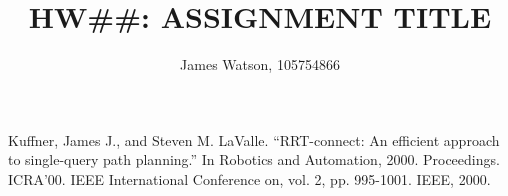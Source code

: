 \documentclass{hw_grad}
\title{HW\#\#: ASSIGNMENT TITLE}
\institute{University of Colorado Boulder}
\author{James Watson, 105754866}
\begin{document}
	\maketitle
	
	
	\begin{thebibliography}{1}
		
		 Kuffner, James J., and Steven M. LaValle. ``RRT-connect: An efficient approach to single-query path planning.'' In Robotics and Automation, 2000. Proceedings. ICRA'00. IEEE International Conference on, vol. 2, pp. 995-1001. IEEE, 2000.
		



		
	\end{thebibliography}
	
\end{document}

